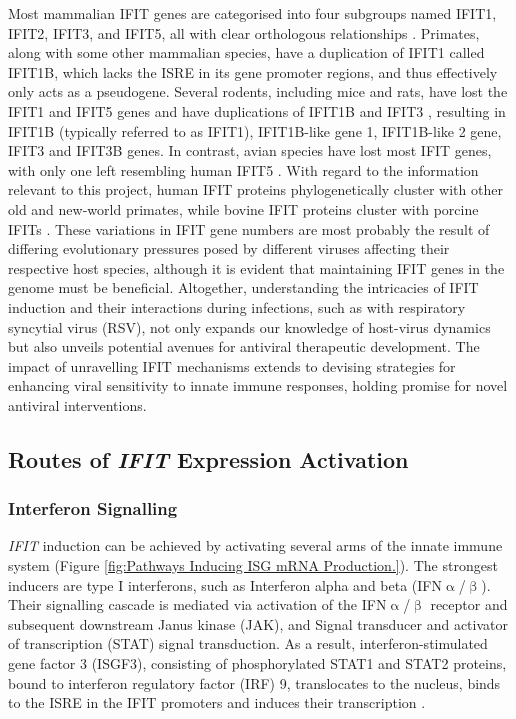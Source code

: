 Most mammalian IFIT genes are categorised into four subgroups named IFIT1, IFIT2, IFIT3, and IFIT5, all with clear orthologous relationships \cite{Sarkar2004NovelGenes}. Primates, along with some other mammalian species, have a duplication of IFIT1 called IFIT1B, which lacks the ISRE in its gene promoter regions, and thus effectively only acts as a pseudogene. Several rodents, including mice and rats, have lost the IFIT1 and IFIT5 genes and have duplications of IFIT1B and IFIT3 \cite{Daugherty2016Evolution-guidedMammals.}, resulting in IFIT1B (typically referred to as IFIT1), IFIT1B-like gene 1, IFIT1B-like 2 gene, IFIT3 and IFIT3B genes. In contrast, avian species have lost most IFIT genes, with only one left resembling human IFIT5 \cite{Liu2013Lineage-SpecificFamily}. With regard to the information relevant to this project, human IFIT proteins phylogenetically cluster with other old and new-world primates, while bovine IFIT proteins cluster with porcine IFITs \cite{Zhou2013InterferonDefense.}. These variations in IFIT gene numbers are most probably the result of differing evolutionary pressures posed by different viruses affecting their respective host species, although it is evident that maintaining IFIT genes in the genome must be beneficial. Altogether, understanding the intricacies of IFIT induction and their interactions during infections, such as with respiratory syncytial virus (RSV), not only expands our knowledge of host-virus dynamics but also unveils potential avenues for antiviral therapeutic development. The impact of unravelling IFIT mechanisms extends to devising strategies for enhancing viral sensitivity to innate immune responses, holding promise for novel antiviral interventions.

\subsection{Routes of \textit{IFIT} Expression Activation} \label{subsec:Routes of IFIT Expression Activation}
\subsubsection{Interferon Signalling} \label{Interferon Signalling}
\textit{IFIT} induction can be achieved by activating several arms of the innate immune system (Figure \ref{fig:Pathways Inducing ISG mRNA Production.}). The strongest inducers are type I interferons, such as Interferon alpha and beta (IFN$\upalpha$/$\upbeta$). Their signalling cascade is mediated via activation of the IFN$\upalpha$/$\upbeta$ receptor and subsequent downstream Janus kinase (JAK), and Signal transducer and activator of transcription (STAT) signal transduction. As a result, interferon-stimulated gene factor 3 (ISGF3), consisting of phosphorylated STAT1 and STAT2 proteins, bound to interferon regulatory factor (IRF) 9, translocates to the nucleus, binds to the ISRE in the IFIT promoters and induces their transcription \cite{Der1998IdentificationArrays, Mesev2019DecodingInfection, Schoggins2011Interferon-stimulatedFunctions}.

